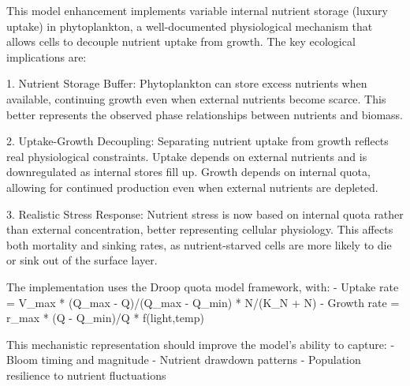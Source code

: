 This model enhancement implements variable internal nutrient storage (luxury uptake) in phytoplankton, a well-documented physiological mechanism that allows cells to decouple nutrient uptake from growth. The key ecological implications are:

1. Nutrient Storage Buffer: Phytoplankton can store excess nutrients when available, continuing growth even when external nutrients become scarce. This better represents the observed phase relationships between nutrients and biomass.

2. Uptake-Growth Decoupling: Separating nutrient uptake from growth reflects real physiological constraints. Uptake depends on external nutrients and is downregulated as internal stores fill up. Growth depends on internal quota, allowing for continued production even when external nutrients are depleted.

3. Realistic Stress Response: Nutrient stress is now based on internal quota rather than external concentration, better representing cellular physiology. This affects both mortality and sinking rates, as nutrient-starved cells are more likely to die or sink out of the surface layer.

The implementation uses the Droop quota model framework, with:
- Uptake rate = V_max * (Q_max - Q)/(Q_max - Q_min) * N/(K_N + N)
- Growth rate = r_max * (Q - Q_min)/Q * f(light,temp)

This mechanistic representation should improve the model's ability to capture:
- Bloom timing and magnitude
- Nutrient drawdown patterns
- Population resilience to nutrient fluctuations
